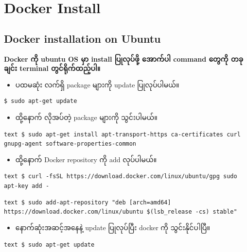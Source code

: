 \documentclass{article}
\begin{document}
\pagebreak

\section{Docker Install}\label{docker-install}

\subsection{Docker installation on
Ubuntu}\label{docker-installation-on-ubuntu}

\textbf{Docker ကို ubuntu OS မှာ install ပြုလုပ်ဖို့ အောက်ပါ command
တွေကို တခုချင်း terminal တွင်ရိုက်ထည့်ပါ။}

\begin{itemize}
\itemsep1pt\parskip0pt
\item
  ပထမဆုံး လက်ရှိ package များကို update ပြုလုပ်ပါမယ်။
\end{itemize}

\begin{verbatim}
$ sudo apt-get update
\end{verbatim}

\begin{itemize}
\itemsep1pt\parskip0pt
\item
  ထို့နောက် လိုအပ်တဲ့ package များကို သွင်းပါမယ်။
\end{itemize}

\texttt{text   \$ sudo apt-get install apt-transport-https ca-certificates curl gnupg-agent software-properties-common}

\begin{itemize}
\itemsep1pt\parskip0pt
\item
  ထို့နောက် Docker repository ကို add လုပ်ပါမယ်။
\end{itemize}

\texttt{text   \$ curl -fsSL https://download.docker.com/linux/ubuntu/gpg \textbar{} sudo apt-key add -}

\texttt{text   \$ sudo add-apt-repository "deb {[}arch=amd64{]} https://download.docker.com/linux/ubuntu \$(lsb\_release -cs) stable"}

\begin{itemize}
\itemsep1pt\parskip0pt
\item
  နောက်ဆုံးအဆင့်အနေနဲ့ update ပြုလုပ်ပြီး docker ကို သွင်းနိုင်ပါပြီ။
\end{itemize}

\texttt{text   \$ sudo apt-get update}
\end{document}
